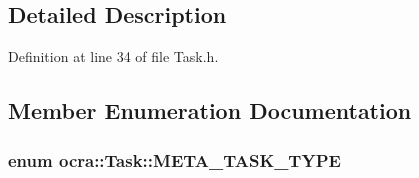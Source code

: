 \subsection{Detailed Description}


Definition at line 34 of file Task.\+h.



\subsection{Member Enumeration Documentation}
\subsubsection[{\texorpdfstring{M\+E\+T\+A\+\_\+\+T\+A\+S\+K\+\_\+\+T\+Y\+PE}{META_TASK_TYPE}}]{\setlength{\rightskip}{0pt plus 5cm}enum {\bf ocra\+::\+Task\+::\+M\+E\+T\+A\+\_\+\+T\+A\+S\+K\+\_\+\+T\+Y\+PE}}\hypertarget{classocra_1_1Task_a8ddf2840d178ca273e886c9ca95248fe}{}\label{classocra_1_1Task_a8ddf2840d178ca273e886c9ca95248fe}
